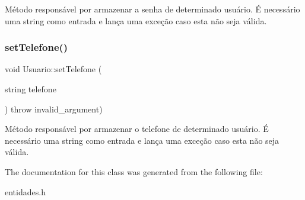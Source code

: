 Método responsável por armazenar a senha de determinado usuário. É necessário uma string como entrada e lança uma exceção caso esta não seja válida. \mbox{\label{classUsuario_a8414f48478d2edf70a4ab274136a3bdf}} 
\subsubsection{\texorpdfstring{set\+Telefone()}{setTelefone()}}
{\footnotesize\ttfamily void Usuario\+::set\+Telefone (\begin{DoxyParamCaption}\item[{string}]{telefone }\end{DoxyParamCaption}) throw  invalid\+\_\+argument) \hspace{0.3cm}{\ttfamily [inline]}}

Método responsável por armazenar o telefone de determinado usuário. É necessário uma string como entrada e lança uma exceção caso esta não seja válida. 

The documentation for this class was generated from the following file\+:\begin{DoxyCompactItemize}
\item 
entidades.\+h\end{DoxyCompactItemize}
